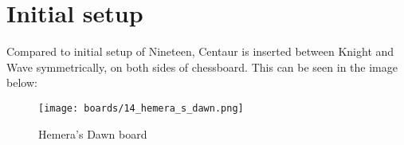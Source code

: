 \section*{Initial setup}

Compared to initial setup of Nineteen, Centaur is inserted between Knight and Wave
symmetrically, on both sides of chessboard. This can be seen in the image below:

\noindent
\begin{figure}[h]
\texttt{[image: boards/14\_hemera\_s\_dawn.png]}
\caption{Hemera's Dawn board}
\label{fig:14_hemera_s_dawn}
\end{figure}

\clearpage %
